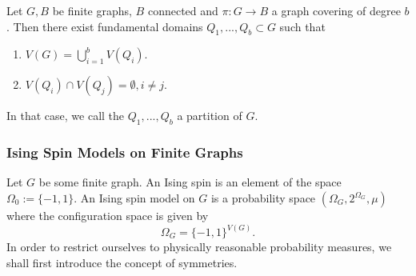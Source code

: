 \documentclass{article}
\begin{document}
Let $G,B$ be finite graphs, $B$ connected and $\pi:G\to B$ a graph covering of degree $b$. Then there exist fundamental domains $Q_1,...,Q_b\subset G$ such that
\begin{enumerate}
    \item[i)] $V(G)=\bigcup_{i=1}^bV(Q_i)$.
    \item[ii)] $V(Q_i)\cap V(Q_j)=\emptyset,i\ne j$. 
\end{enumerate}
In that case, we call the $Q_1,...,Q_b$ a partition of $G$.

\subsubsection{Ising Spin Models on Finite Graphs}

Let $G$ be some finite graph. An Ising spin is an element of the space $\Omega_0:=\{-1,1\}$. An Ising spin model on $G$ is a probability space $(\Omega_G,2^{\Omega_G},\mu)$ where the configuration space is given by
\begin{equation}
    \Omega_G=\{-1,1\}^{V(G)}.
\end{equation}
In order to restrict ourselves to physically reasonable probability measures, we shall first introduce the concept of symmetries.
\end{document}
